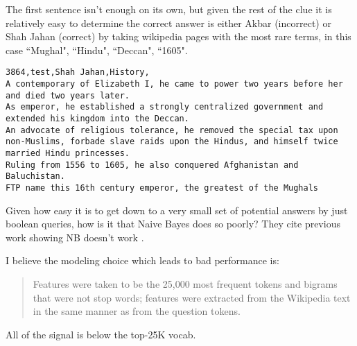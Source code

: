 \documentclass[12pt]{article}
\begin{document}
The first sentence isn't enough on its own, but given the rest of the clue
it is relatively easy to determine the correct answer is either Akbar (incorrect)
or Shah Jahan (correct) by taking wikipedia pages with the most rare terms,
in this case ``Mughal", ``Hindu", ``Deccan", ``1605".

\begin{verbatim}
3864,test,Shah Jahan,History,
A contemporary of Elizabeth I, he came to power two years before her and died two years later.
As emperor, he established a strongly centralized government and extended his kingdom into the Deccan.
An advocate of religious tolerance, he removed the special tax upon non-Muslims, forbade slave raids upon the Hindus, and himself twice married Hindu princesses.
Ruling from 1556 to 1605, he also conquered Afghanistan and Baluchistan.
FTP name this 16th century emperor, the greatest of the Mughals
\end{verbatim}


Given how easy it is to get down to a very small set of potential
answers by just boolean queries,
how is it that Naive Bayes does so poorly?
They cite previous work showing NB doesn't work \cite{Boyd-Graber:2012}.


I believe the modeling choice which leads to bad performance is:
\begin{quote}
Features were taken to be the 25,000 most frequent tokens and bigrams that were
not stop words; features were extracted from the Wikipedia text in the same
manner as from the question tokens.
\end{quote}

All of the signal is below the top-25K vocab.
\end{document}
